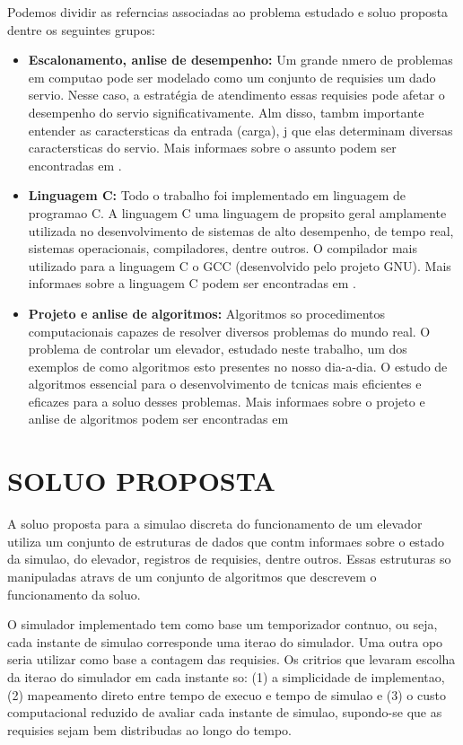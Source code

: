 \documentclass[12pt]{article}
\begin{document}
Podemos dividir as referncias associadas ao problema estudado e  soluo proposta dentre os seguintes grupos:
\begin{itemize}
\item \textbf{Escalonamento, anlise de desempenho:} Um grande nmero de problemas em computao pode ser modelado como um conjunto de requisies  um dado servio. Nesse caso, a estratégia de atendimento  essas requisies pode afetar o desempenho do servio significativamente. Alm disso, tambm  importante entender as caractersticas da entrada (carga), j que elas determinam diversas caractersticas do servio. Mais informaes sobre o assunto podem ser encontradas em \cite{jain1991acs}.
\item \textbf{Linguagem C:}
	Todo o trabalho foi implementado em linguagem de programao C. A linguagem C  uma linguagem de propsito geral amplamente utilizada no desenvolvimento de sistemas de alto desempenho, de tempo real, sistemas operacionais, compiladores, dentre outros. O compilador mais utilizado para a linguagem C  o GCC (desenvolvido pelo projeto GNU). Mais informaes sobre a linguagem C podem ser encontradas em \cite{kernighan1988cpl}.
\item \textbf{Projeto e anlise de algoritmos:} Algoritmos so procedimentos computacionais capazes de resolver diversos problemas do mundo real. O problema de controlar um elevador, estudado neste trabalho,  um dos exemplos de como algoritmos esto presentes no nosso dia-a-dia. O estudo de algoritmos  essencial para o desenvolvimento de tcnicas mais eficientes e eficazes para a soluo desses problemas. Mais informaes sobre o projeto e anlise de algoritmos podem ser encontradas em \cite{ziviani2007pai,cormen2001ia,sedgewick2001acp}
\end{itemize}

\section{SOLUO PROPOSTA}
\label{solucao_proposta}

A soluo proposta para a simulao discreta do funcionamento de um elevador utiliza um conjunto de estruturas de dados que contm informaes sobre o estado da simulao, do elevador, registros de requisies, dentre outros. Essas estruturas so manipuladas atravs de um conjunto de algoritmos que descrevem o funcionamento da soluo.

O simulador implementado tem como base um temporizador contnuo, ou seja, cada instante de simulao corresponde  uma iterao do simulador. Uma outra opo seria utilizar como base a contagem das requisies. Os critrios que levaram  escolha da iterao do simulador em cada instante so: (1) a simplicidade de implementao, (2) mapeamento direto entre tempo de execuo e tempo de simulao e (3) o custo computacional reduzido de avaliar cada instante de simulao, supondo-se que as requisies sejam bem distribudas ao longo do tempo.
\end{document}
